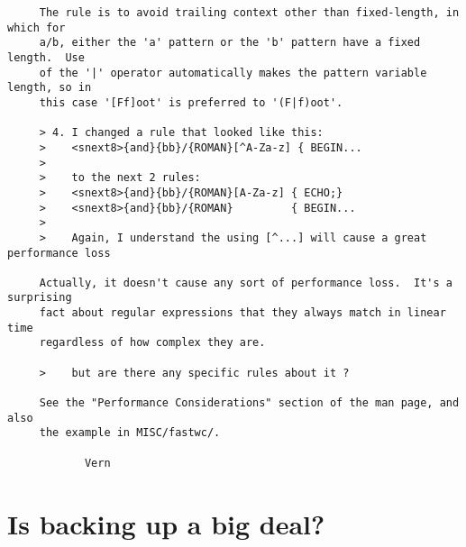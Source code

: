 \documentclass[openany,oneside]{book}
\begin{document}
\begin{verbatim}
     The rule is to avoid trailing context other than fixed-length, in which for
     a/b, either the 'a' pattern or the 'b' pattern have a fixed length.  Use
     of the '|' operator automatically makes the pattern variable length, so in
     this case '[Ff]oot' is preferred to '(F|f)oot'.
     
     > 4. I changed a rule that looked like this:
     >    <snext8>{and}{bb}/{ROMAN}[^A-Za-z] { BEGIN...
     >
     >    to the next 2 rules:
     >    <snext8>{and}{bb}/{ROMAN}[A-Za-z] { ECHO;}
     >    <snext8>{and}{bb}/{ROMAN}         { BEGIN...
     >
     >    Again, I understand the using [^...] will cause a great performance loss
     
     Actually, it doesn't cause any sort of performance loss.  It's a surprising
     fact about regular expressions that they always match in linear time
     regardless of how complex they are.
     
     >    but are there any specific rules about it ?
     
     See the "Performance Considerations" section of the man page, and also
     the example in MISC/fastwc/.
     
     		Vern
\end{verbatim}

\section{Is backing up a big deal?}
\end{document}

